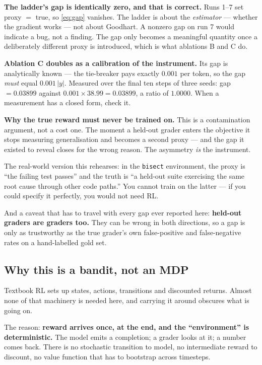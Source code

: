 \documentclass[11pt,letterpaper]{article}
\theoremstyle{definition}
\begin{document}
\textbf{The ladder's gap is identically zero, and that is correct.} Runs 1--7 set proxy $=$ true, so
\cref{eq:gap} vanishes. The ladder is about the \emph{estimator} --- whether the gradient works ---
not about Goodhart. A nonzero gap on run 7 would indicate a bug, not a finding. The gap only becomes
a meaningful quantity once a deliberately different proxy is introduced, which is what ablations B
and C do.

\textbf{Ablation C doubles as a calibration of the instrument.} Its gap is analytically known ---
the tie-breaker pays exactly $0.001$ per token, so the gap \emph{must} equal $0.001\,|y|$. Measured
over the final ten steps of three seeds: gap $= 0.03899$ against $0.001 \times 38.99 = 0.03899$, a
ratio of $1.0000$. When a measurement has a closed form, check it.

\begin{aside}
\textbf{Why the true reward must never be trained on.} This is a contamination argument, not a cost
one. The moment a held-out grader enters the objective it stops measuring generalisation and becomes
a second proxy --- and the gap it existed to reveal closes for the wrong reason. The asymmetry
\emph{is} the instrument.

The real-world version this rehearses: in the \texttt{bisect} environment, the proxy is ``the failing
test passes'' and the truth is ``a held-out suite exercising the same root cause through other code
paths.'' You cannot train on the latter --- if you could specify it perfectly, you would not need RL.

And a caveat that has to travel with every gap ever reported here: \textbf{held-out graders are
graders too.} They can be wrong in both directions, so a gap is only as trustworthy as the true
grader's own false-positive and false-negative rates on a hand-labelled gold set.
\end{aside}

\subsection{Why this is a bandit, not an MDP}

Textbook RL sets up states, actions, transitions and discounted returns. Almost none of that
machinery is needed here, and carrying it around obscures what is going on.

The reason: \textbf{reward arrives once, at the end, and the ``environment'' is deterministic.} The
model emits a completion; a grader looks at it; a number comes back. There is no stochastic
transition to model, no intermediate reward to discount, no value function that has to bootstrap
across timesteps.
\end{document}
